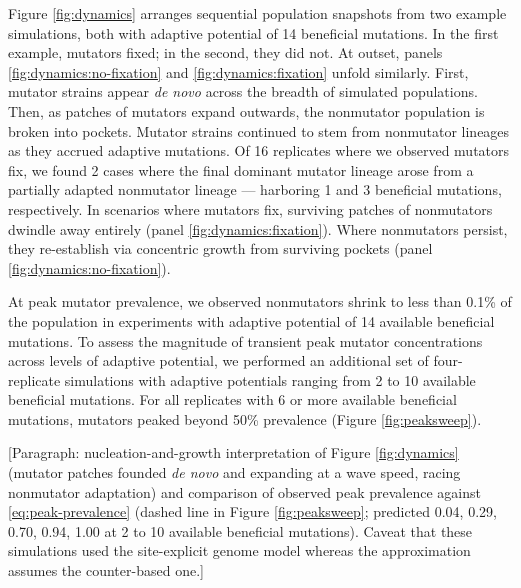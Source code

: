 Figure \ref{fig:dynamics} arranges sequential population snapshots from two example simulations, both with adaptive potential of 14 beneficial mutations.
In the first example, mutators fixed; in the second, they did not.
At outset, panels \ref{fig:dynamics:no-fixation} and \ref{fig:dynamics:fixation} unfold similarly.
First, mutator strains appear \textit{de novo} across the breadth of simulated populations.
Then, as patches of mutators expand outwards, the nonmutator population is broken into pockets.
Mutator strains continued to stem from nonmutator lineages as they accrued adaptive mutations.
Of 16 replicates where we observed mutators fix, we found 2 cases where the final dominant mutator lineage arose from a partially adapted nonmutator lineage --- harboring 1 and 3 beneficial mutations, respectively.
In scenarios where mutators fix, surviving patches of nonmutators dwindle away entirely (panel \ref{fig:dynamics:fixation}).
Where nonmutators persist, they re-establish via concentric growth from surviving pockets (panel \ref{fig:dynamics:no-fixation}).



At peak mutator prevalence, we observed nonmutators shrink to less than 0.1\% of the population in experiments with adaptive potential of 14 available beneficial mutations.
To assess the magnitude of transient peak mutator concentrations across levels of adaptive potential, we performed an additional set of four-replicate simulations with adaptive potentials ranging from 2 to 10 available beneficial mutations.
For all replicates with 6 or more available beneficial mutations, mutators peaked beyond 50\% prevalence (Figure \ref{fig:peaksweep}).

[Paragraph: nucleation-and-growth interpretation of Figure \ref{fig:dynamics} (mutator patches founded \textit{de novo} and expanding at a wave speed, racing nonmutator adaptation) and comparison of observed peak prevalence against \cref{eq:peak-prevalence} (dashed line in Figure \ref{fig:peaksweep}; predicted 0.04, 0.29, 0.70, 0.94, 1.00 at 2 to 10 available beneficial mutations). Caveat that these simulations used the site-explicit genome model whereas the approximation assumes the counter-based one.]

